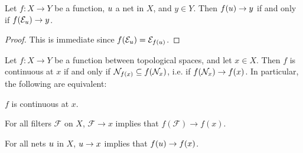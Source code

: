 \documentclass[article, a4paper, 11pt, oneside]{memoir}
\numberwithin{equation}{chapter}
\newcommand{\calF}{\mathcal{F}}
\theoremstyle{nonumberplain}
\begin{document}
\begin{corollary}
    \label{thm:filter-net-convergence}
    Let $f \colon X \to Y$ be a function, $\mynet$ a net in $X$, and $y \in Y$. Then $f(\mynet) \to y$ if and only if $f(\evfilt[\mynet]) \to y$.
\end{corollary}

\begin{proof}
    This is immediate since $f(\evfilt[\mynet]) = \evfilt[f(\mynet)]$.
\end{proof}


\begin{proposition}
    \label{thm:continuity-filter-net}
    Let $f \colon X \to Y$ be a function between topological spaces, and let $x \in X$. Then $f$ is continuous at $x$ if and only if $\nhoods{f(x)} \subseteq f(\nhoods{x})$, i.e. if $f(\nhoods{x}) \to f(x)$. In particular, the following are equivalent:
    \begin{enumprop}
        \item \label{enum:continuity-point} $f$ is continuous at $x$.
        \item \label{enum:filter-convergence-point} For all filters $\calF$ on $X$, $\calF \to x$ implies that $f(\calF) \to f(x)$.
        \item \label{enum:net-convergence-point} For all nets $\mynet$ in $X$, $\mynet \to x$ implies that $f(\mynet) \to f(x)$.
    \end{enumprop}
\end{proposition}
\end{document}
